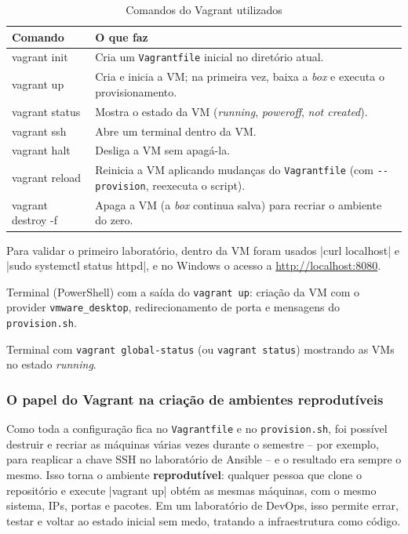 \begin{table}[H]
  \centering
  \caption{Comandos do Vagrant utilizados}\label{tab:comandos-vagrant}
  \small
  \renewcommand{\arraystretch}{1.15}
  \begin{tabularx}{\linewidth}{>{\ttfamily}l >{\raggedright\arraybackslash}X}
    \toprule
    \normalfont\bfseries Comando & \textbf{O que faz} \\
    \midrule
    vagrant init & Cria um \texttt{Vagrantfile} inicial no diretório atual. \\
    vagrant up & Cria e inicia a VM; na primeira vez, baixa a \textit{box} e executa o provisionamento. \\
    vagrant status & Mostra o estado da VM (\textit{running}, \textit{poweroff}, \textit{not created}). \\
    vagrant ssh & Abre um terminal dentro da VM. \\
    vagrant halt & Desliga a VM sem apagá-la. \\
    vagrant reload & Reinicia a VM aplicando mudanças do \texttt{Vagrantfile} (com \texttt{-{}-provision}, reexecuta o script). \\
    vagrant destroy -f & Apaga a VM (a \textit{box} continua salva) para recriar o ambiente do zero. \\
    \bottomrule
  \end{tabularx}
\end{table}

Para validar o primeiro laboratório, dentro da VM foram usados \cod|curl localhost| e
\cod|sudo systemctl status httpd|, e no Windows o acesso a \url{http://localhost:8080}.

%
  {Terminal (PowerShell) com a saída do \texttt{vagrant up}: criação da VM com o provider
   \texttt{vmware\_desktop}, redirecionamento de porta e mensagens do \texttt{provision.sh}.}

%
  {Terminal com \texttt{vagrant global-status} (ou \texttt{vagrant status}) mostrando as VMs no
   estado \textit{running}.}

\subsubsection{O papel do Vagrant na criação de ambientes reprodutíveis}

Como toda a configuração fica no \texttt{Vagrantfile} e no \texttt{provision.sh}, foi possível
destruir e recriar as máquinas várias vezes durante o semestre -- por exemplo, para reaplicar a chave
SSH no laboratório de Ansible -- e o resultado era sempre o mesmo. Isso torna o ambiente
\textbf{reprodutível}: qualquer pessoa que clone o repositório e execute \cod|vagrant up| obtém as
mesmas máquinas, com o mesmo sistema, IPs, portas e pacotes. Em um laboratório de DevOps, isso permite
errar, testar e voltar ao estado inicial sem medo, tratando a infraestrutura como código.
